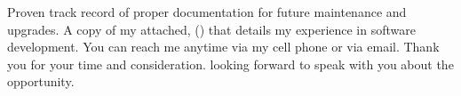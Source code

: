 \documentclass{subfiles}
\begin{document}
Proven track record of proper documentation for future maintenance and upgrades.
A copy of my  attached, 
() 
that details my experience in software development.
\newline
You can reach me anytime via my cell phone or via email.
Thank you for your time and consideration. looking forward to speak with you about the opportunity.

\makeletterclosing %

\newpage
\end{document}
